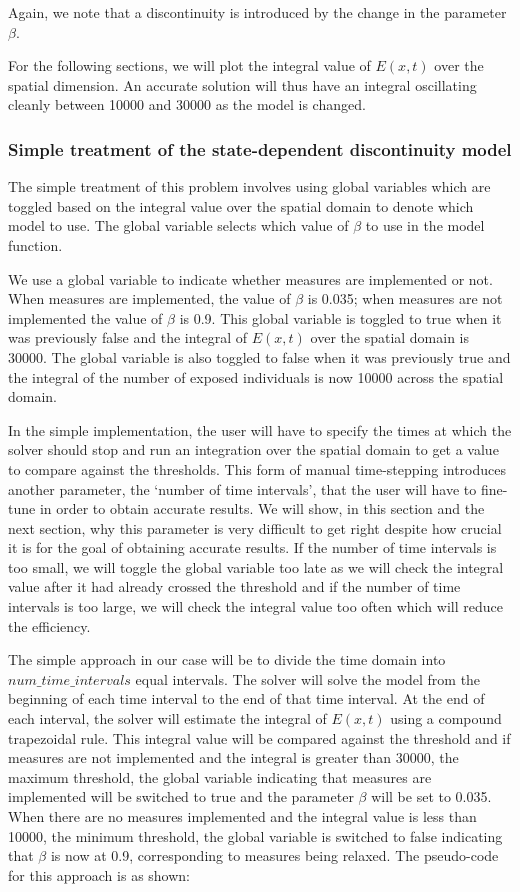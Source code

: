 \documentclass{article}
\begin{document}
Again, we note that a discontinuity is introduced by the change in the parameter $\beta$.

For the following sections, we will plot the integral value of $E(x, t)$ over the spatial dimension. An accurate solution will thus have an integral oscillating cleanly between 10000 and 30000 as the model is changed.

\subsubsection{Simple treatment of the state-dependent discontinuity model}
\label{subsubsection:pde_state_naive}
The simple treatment of this problem involves using global variables which are toggled based on the integral value over the spatial domain to denote which model to use. The global variable selects which value of $\beta$ to use in the model function.

We use a global variable to indicate whether measures are implemented or not. When measures are implemented, the value of $\beta$ is 0.035; when measures are not implemented the value of $\beta$ is 0.9. This global variable is toggled to true when it was previously false and the integral of $E(x, t)$ over the spatial domain is 30000. The global variable is also toggled to false when it was previously true and the integral of the number of exposed individuals is now 10000 across the spatial domain. 

In the simple implementation, the user will have to specify the times at which the solver should stop and run an integration over the spatial domain to get a value to compare against the thresholds. This form of manual time-stepping introduces another parameter, the `number of time intervals', that the user will have to fine-tune in order to obtain accurate results. We will show, in this section and the next section, why this parameter is very difficult to get right despite how crucial it is for the goal of obtaining accurate results. If the number of time intervals is too small, we will toggle the global variable too late as we will check the integral value after it had already crossed the threshold and if the number of time intervals is too large, we will check the integral value too often which will reduce the efficiency. 

The simple approach in our case will be to divide the time domain into $num\_time\_intervals$ equal intervals. The solver will solve the model from the beginning of each time interval to the end of that time interval. At the end of each interval, the solver will estimate the integral of $E(x, t)$ using a compound trapezoidal rule. This integral value will be compared against the threshold and if measures are not implemented and the integral is greater than 30000, the maximum threshold, the global variable indicating that measures are implemented will be switched to true and the parameter $\beta$ will be set to 0.035. When there are no measures implemented and the integral value is less than 10000, the minimum threshold, the global variable is switched to false indicating that $\beta$ is now at 0.9, corresponding to measures being relaxed. The pseudo-code for this approach is as shown:
\end{document}
